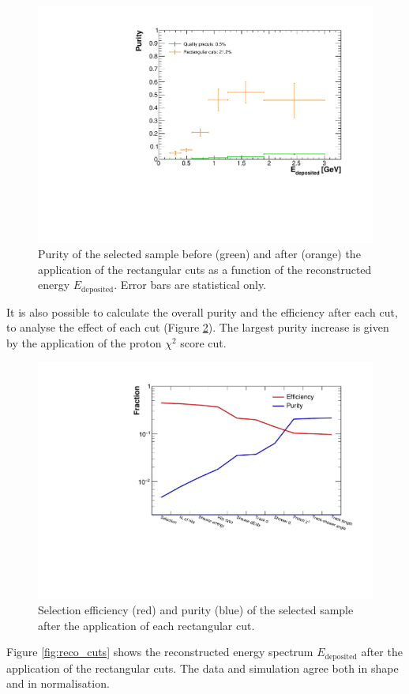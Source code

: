 \begin{figure}[htbp]
\centering
  \includegraphics[width=0.75\linewidth]{figures/purity_sel.pdf}
  \caption{Purity of the selected sample before (green) and after (orange) the application of the rectangular cuts as a function of the reconstructed energy $E_{\mathrm{deposited}}$. Error bars are statistical only.}\label{fig:purity_sel}
\end{figure}

It is also possible to calculate the overall purity and the efficiency after each cut, to analyse the effect of each cut (Figure \ref{fig:effpurity_cuts}). The largest purity increase is given by the application of the proton $\chi^2$ score cut. 

\begin{figure}[htbp]
\centering
  \includegraphics[width=0.75\linewidth]{figures/purity_eff.pdf}
  \caption{Selection efficiency (red) and purity (blue) of the selected sample after the application of each rectangular cut.}\label{fig:effpurity_cuts}
\end{figure}

Figure \ref{fig:reco_cuts} shows the reconstructed energy spectrum $E_{\mathrm{deposited}}$ after the application of the rectangular cuts. The data and simulation agree both in shape and in normalisation.

